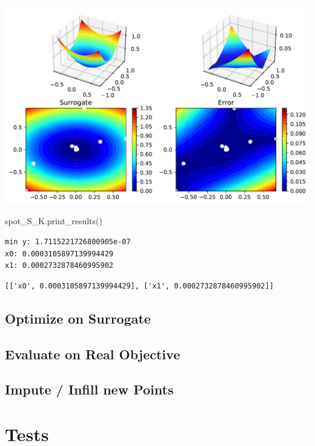 \documentclass[
  letterpaper,
  DIV=11,
  numbers=noendperiod]{scrreprt}
\newenvironment{Shaded}{\begin{snugshade}}{\end{snugshade}}
\newcommand{\NormalTok}[1]{\textcolor[rgb]{0.00,0.23,0.31}{#1}}
\begin{document}
\includegraphics{012_num_spot_ei_files/figure-pdf/cell-40-output-1.pdf}

\begin{Shaded}
\begin{Highlighting}[]
\NormalTok{spot\_S\_K.print\_results()}
\end{Highlighting}
\end{Shaded}

\begin{verbatim}
min y: 1.7115221726800905e-07
x0: 0.0003105897139994429
x1: 0.0002732878460995902
\end{verbatim}

\begin{verbatim}
[['x0', 0.0003105897139994429], ['x1', 0.0002732878460995902]]
\end{verbatim}

\subsection{Optimize on Surrogate}\label{optimize-on-surrogate}

\subsection{Evaluate on Real
Objective}\label{evaluate-on-real-objective}

\subsection{Impute / Infill new Points}\label{impute-infill-new-points}

\section{Tests}\label{tests}
\end{document}
